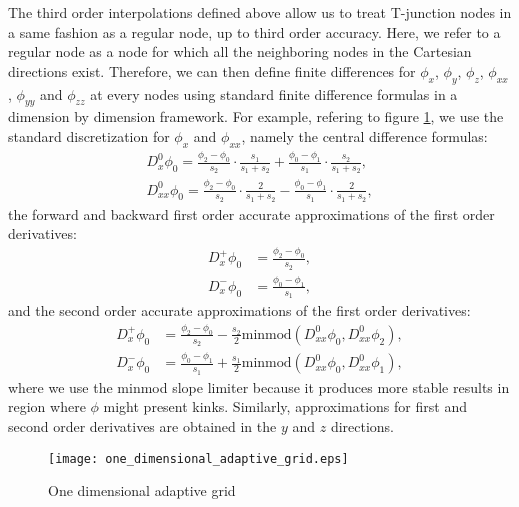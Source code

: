 \documentclass[english]{article}
\begin{document}
The third order interpolations defined above allow us to treat T-junction
nodes in a same fashion as a regular node, up to third order accuracy.
Here, we refer to a regular node as a node for which all the neighboring
nodes in the Cartesian directions exist. Therefore, we can then define
finite differences for $\phi_x$, $\phi_y$, $\phi_z$, $\phi_{xx}$,
$\phi_{yy}$ and $\phi_{zz}$ at every nodes using standard finite difference
formulas in a dimension by dimension framework. For example, refering to
figure \ref{fig_one_dimensional_adaptive_grid}, we use the standard
discretization for $\phi_x$ and $\phi_{xx}$, namely the central difference
formulas:
\begin{equation}
\begin{split}D^0_x\phi_0=\frac{\phi_2-\phi_0}{s_2}\cdot\frac{s_1}{s_1+s_2} + \frac{\phi_0-\phi_1}{s_1}\cdot\frac{s_2}{s_1+s_2},\\
D^0_{xx}\phi_0=\frac{\phi_2-\phi_0}{s_2}\cdot\frac{2}{s_1+s_2} - \frac{\phi_0-\phi_1}{s_1}\cdot\frac{2}{s_1+s_2},
\end{split}
\label{Central_Differencing}
\end{equation}
the forward and backward first order accurate approximations of the first order derivatives:
\begin{equation}
\begin{split}
D^+_x\phi_0 &= \frac{\phi_2-\phi_0}{s_2},\\
D^-_x\phi_0 &= \frac{\phi_0-\phi_1}{s_1},
\end{split}
\label{one_sided_1_fdm}
\end{equation}
and the second order accurate approximations of the first order derivatives:
\begin{equation}
\begin{split}
D^+_x\phi_0 &= \frac{\phi_2-\phi_0}{s_2} - \frac{s_2}{2}\text{minmod}\left(D^0_{xx}\phi_0,D^0_{xx}\phi_2\right),\\
D^-_x\phi_0 &= \frac{\phi_0-\phi_1}{s_1} +
\frac{s_1}{2}\text{minmod}\left(D^0_{xx}\phi_0,D^0_{xx}\phi_1\right),
\end{split}
\label{one_sided_2_fdm}
\end{equation}
where we use the minmod slope limiter \cite{Shu:1988:ENO,liu:1996:WENO}
because it produces more stable results in region where $\phi$ might
present kinks. Similarly, approximations for first and second order
derivatives are obtained in the $y$ and $z$ directions.

\begin{figure}
\begin{center}
\texttt{[image: one\_dimensional\_adaptive\_grid.eps]}
\end{center}
\caption{One dimensional adaptive grid}
\label{fig_one_dimensional_adaptive_grid}
\end{figure}
%
%
\end{document}
